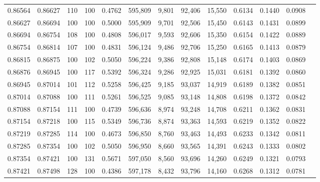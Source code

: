 \begin{tabular}{rrrrrrrrrrrrr}
0.86564 & 0.86627 &   110 & 100 &                                     0.4762 & 595,809 &   9,801 &  92,406 &  15,550 & 0.6134 & 0.1440 & 0.0908 \\
0.86627 & 0.86694 &   100 & 100 &                                     0.5000 & 595,909 &   9,701 &  92,506 &  15,450 & 0.6143 & 0.1431 & 0.0899 \\
0.86694 & 0.86754 &   108 & 100 &                                     0.4808 & 596,017 &   9,593 &  92,606 &  15,350 & 0.6154 & 0.1422 & 0.0889 \\
0.86754 & 0.86814 &   107 & 100 &                                     0.4831 & 596,124 &   9,486 &  92,706 &  15,250 & 0.6165 & 0.1413 & 0.0879 \\
0.86815 & 0.86875 &   100 & 102 &                                     0.5050 & 596,224 &   9,386 &  92,808 &  15,148 & 0.6174 & 0.1403 & 0.0869 \\
0.86876 & 0.86945 &   100 & 117 &                                     0.5392 & 596,324 &   9,286 &  92,925 &  15,031 & 0.6181 & 0.1392 & 0.0860 \\
0.86945 & 0.87014 &   101 & 112 &                                     0.5258 & 596,425 &   9,185 &  93,037 &  14,919 & 0.6189 & 0.1382 & 0.0851 \\
0.87014 & 0.87088 &   100 & 111 &                                     0.5261 & 596,525 &   9,085 &  93,148 &  14,808 & 0.6198 & 0.1372 & 0.0842 \\
0.87088 & 0.87154 &   111 & 100 &                                     0.4739 & 596,636 &   8,974 &  93,248 &  14,708 & 0.6211 & 0.1362 & 0.0831 \\
0.87154 & 0.87218 &   100 & 115 &                                     0.5349 & 596,736 &   8,874 &  93,363 &  14,593 & 0.6219 & 0.1352 & 0.0822 \\
0.87219 & 0.87285 &   114 & 100 &                                     0.4673 & 596,850 &   8,760 &  93,463 &  14,493 & 0.6233 & 0.1342 & 0.0811 \\
0.87285 & 0.87354 &   100 & 102 &                                     0.5050 & 596,950 &   8,660 &  93,565 &  14,391 & 0.6243 & 0.1333 & 0.0802 \\
0.87354 & 0.87421 &   100 & 131 &                                     0.5671 & 597,050 &   8,560 &  93,696 &  14,260 & 0.6249 & 0.1321 & 0.0793 \\
0.87421 & 0.87498 &   128 & 100 &                                     0.4386 & 597,178 &   8,432 &  93,796 &  14,160 & 0.6268 & 0.1312 & 0.0781 \\

\end{tabular}
